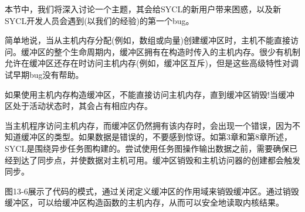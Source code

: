 本节中，我们将深入讨论一个主题，其会给SYCL的新用户带来困惑，以及新SYCL开发人员会遇到(以我们的经验)的第一个bug。\par

简单地说，当从主机内存分配(例如，数组或向量)创建缓冲区时，主机不能直接访问。缓冲区的整个生命周期内，缓冲区拥有在构造时传入的主机内存。很少有机制允许在缓冲区还存在时访问主机内存(例如，缓冲区互斥)，但是这些高级特性对调试早期bug没有帮助。\par

\begin{tcolorbox}[colback=red!5!white,colframe=red!75!black]
如果使用主机内存构造缓冲区，不能直接访问主机内存，直到缓冲区销毁!当缓冲区处于活动状态时，其会占有相应内存。
\end{tcolorbox}

当主机程序访问主机内存，而缓冲区仍然拥有该内存时，会出现一个错误，因为不知道缓冲区的类型。如果数据是错误的，不要感到惊讶。如第3章和第8章所述，SYCL是围绕异步任务图构建的。尝试使用任务图操作输出数据之前，需要确保已经到达了同步点，并使数据对主机可用。缓冲区销毁和主机访问器的创建都会触发同步。\par

图13-6展示了代码的模式，通过关闭定义缓冲区的作用域来销毁缓冲区。通过销毁缓冲区，可以给缓冲区构造函数的主机内存，从而可以安全地读取内核结果。\par

